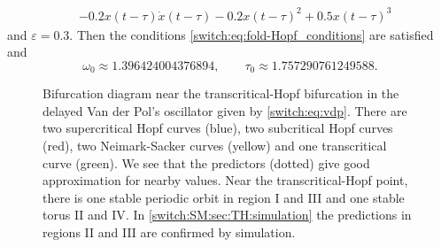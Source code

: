 \begin{subappendices}
\begin{align*}
						&-0.2 x(t-\tau) \dot{x}(t-\tau)-0.2 x(t-\tau)^2+0.5 x(t-\tau)^3
\end{align*}
and $\varepsilon=0.3$. Then the conditions \cref{switch:eq:fold-Hopf_conditions} are satisfied and
\begin{equation}
\omega_{0}\approx1.396424004376894,\qquad\tau_{0}\approx1.757290761249588.\label{switch:eq:vdpo_omega0_tau0}
\end{equation}
%
\begin{figure}[htbp]
\caption{\label{switch:fig:HT_bifurcation_diagram} Bifurcation diagram near the
  transcritical-Hopf bifurcation in the delayed Van der Pol's oscillator given
  by \cref{switch:eq:vdp}. There are two supercritical Hopf curves (blue), two
  subcritical Hopf curves (red), two Neimark-Sacker curves (yellow) and one
  transcritical curve (green).  We see that the predictors (dotted) give good
  approximation for nearby values. Near the transcritical-Hopf point, there is
  one stable periodic orbit in region {I} and {III} and one stable torus {II} and
  {IV}. In \cref{switch:SM:sec:TH:simulation} the predictions in regions {II} and {III}
  are confirmed by simulation.}
\end{figure}
%


\end{subappendices}
